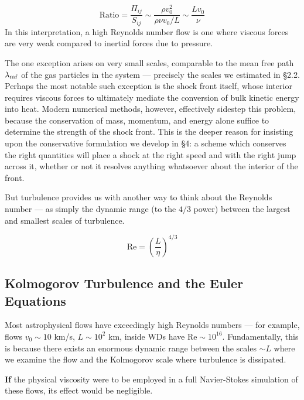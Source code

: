 \documentclass[notoc]{tufte-handout}
\begin{document}
\begin{equation}
\text{Ratio} = \frac{\Pi_{ij}}{S_{ij}} \sim \frac{\rho v_0^2}{\rho \nu v_0 / L} \sim \frac{L v_0}{\nu}
\end{equation}
%
In this interpretation, a high Reynolds number flow is one where viscous forces are very weak compared to inertial forces due to pressure.

The one exception arises on very small scales, comparable to the mean free path $\lambda_{\rm mf}$ of the gas particles in the system --- precisely the scales we estimated in \S 2.2. Perhaps the most notable such exception is the shock front itself, whose interior requires viscous forces to ultimately mediate the conversion of bulk kinetic energy into heat. Modern numerical methods, however, effectively sidestep this problem, because the conservation of mass, momentum, and energy alone suffice to determine the strength of the shock front. This is the deeper reason for insisting upon the conservative formulation we develop in \S 4: a scheme which conserves the right quantities will place a shock at the right speed and with the right jump across it, whether or not it resolves anything whatsoever about the interior of the front.

But turbulence provides us with another way to think about the Reynolds number --- as simply the dynamic range (to the $4/3$ power) between the largest and smallest scales of turbulence.

\begin{equation}
\boxed{ \mathrm{Re} = \left( \frac{L}{\eta} \right)^{4/3} }
\end{equation}

\subsection{Kolmogorov Turbulence and the Euler Equations}

Most astrophysical flows have exceedingly high Reynolds numbers --- for example, flows $v_0 \sim 10$ km/s, $L \sim 10^2$ km, inside WDs have $\mathrm{Re} \sim 10^{16}$. Fundamentally, this is because there exists an enormous dynamic range between the scales $\sim L$ where we examine the flow and the Kolmogorov scale where turbulence is dissipated.

{\bf If} the physical viscosity were to be employed in a full Navier-Stokes simulation of these flows, its effect would be negligible.

\begin{center}
\end{center}
\end{document}
